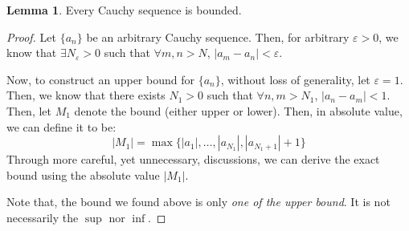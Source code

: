\documentclass[12pt]{article}
\theoremstyle{definition}
\newtheorem{lemma}[theorem]{Lemma}
\theoremstyle{plain}
\begin{document}
\begin{lemma}
    Every Cauchy sequence is bounded.
    \label{lemma:Cauchy_is_bounded}
    \begin{proof} Let $\{a_n\}$ be an arbitrary Cauchy sequence. Then, for
        arbitrary $\varepsilon>0$, we know that $\exists N_\varepsilon > 0$ such
        that $\forall m,n > N$, $|a_m - a_n | < \varepsilon$.

        Now, to construct an upper bound for $\{a_n\}$, without loss of
        generality, let $\varepsilon = 1$. Then, we know that there exists $N_1
        > 0$ such that $\forall n,m > N_1$, $|a_n - a_m| < 1$. Then, let $M_1$
        denote the bound (either upper or lower). Then, in absolute value, we can
        define it to be:
        \[
            |M_1| = \max \{|a_1|, \ldots, |a_{N_{1}}|, |a_{N_1+1}| +
            1\}
        \]
        Through more careful, yet unnecessary, discussions, we can derive the
        exact bound using the absolute value $|M_1|$.

        Note that, the bound we found above is only \textit{one of the upper
        bound}. It is not necessarily the $\sup$ nor $\inf$.
    \end{proof}
\end{lemma}
\end{document}
